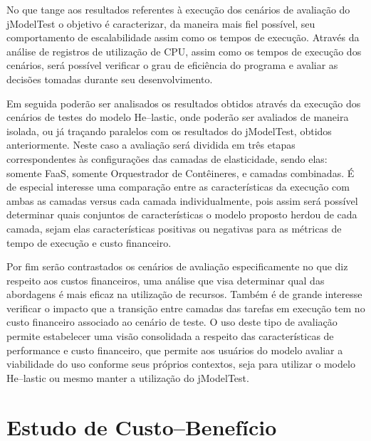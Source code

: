 \documentclass[english,brazilian]{UNISINOSmonografia} %
\begin{document}
No que tange aos resultados referentes à execução dos cenários de avaliação do jModelTest o objetivo é caracterizar, da maneira mais fiel possível, seu comportamento de escalabilidade assim como os tempos de execução.
%
Através da análise de registros de utilização de CPU, assim como os tempos de execução dos cenários, será possível verificar o grau de eficiência do programa e avaliar as decisões tomadas durante seu desenvolvimento.



Em seguida poderão ser analisados os resultados obtidos através da execução dos cenários de testes do modelo \textsf{He}--lastic, onde poderão ser avaliados de maneira isolada, ou já traçando paralelos com os resultados do jModelTest, obtidos anteriormente.
%
Neste caso a avaliação será dividida em três etapas correspondentes às configurações das camadas de elasticidade, sendo elas: somente FaaS, somente Orquestrador de Contêineres, e camadas combinadas.
%
É de especial interesse uma comparação entre as características da execução com ambas as camadas versus cada camada individualmente, pois assim será possível determinar quais conjuntos de características o modelo proposto herdou de cada camada, sejam elas características positivas ou negativas para as métricas de tempo de execução e custo financeiro.



Por fim serão contrastados os cenários de avaliação especificamente no que diz respeito aos custos financeiros, uma análise que visa determinar qual das abordagens é mais eficaz na utilização de recursos.
%
Também é de grande interesse verificar o impacto que a transição entre camadas das tarefas em execução tem no custo financeiro associado ao cenário de teste.
%
O uso deste tipo de avaliação permite estabelecer uma visão consolidada a respeito das características de performance e custo financeiro, que permite aos usuários do modelo avaliar a viabilidade do uso conforme seus próprios contextos, seja para utilizar o modelo \textsf{He}--lastic ou mesmo manter a utilização do jModelTest.





\section{Estudo de Custo--Benefício}
\label{sec:modelo-custben}

\end{document}

